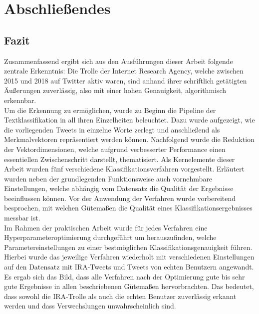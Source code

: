 \section{Abschließendes}\raggedbottom
\subsection{Fazit}
Zusammenfassend ergibt sich aus den Ausführungen dieser Arbeit folgende zentrale Erkenntnis: Die Trolle der Internet Research Agency, welche zwischen 2015 und 2018 auf Twitter aktiv waren, sind anhand ihrer schriftlich getätigten Äußerungen zuverlässig, also mit einer hohen Genauigkeit, algorithmisch erkennbar.\\
Um die Erkennung zu ermöglichen, wurde zu Beginn die Pipeline der Textklassifikation in all ihren Einzelheiten beleuchtet. Dazu wurde aufgezeigt, wie die vorliegenden Tweets in einzelne Worte zerlegt und anschließend als Merkmalvektoren repräsentiert werden können. Nachfolgend wurde die Reduktion der Vektordimensionen, welche aufgrund verbesserter Performance einen essentiellen Zwischenschritt darstellt, thematisiert. Als Kernelemente dieser Arbeit wurden fünf verschiedene Klassifikationsverfahren vorgestellt. Erläutert wurden neben der grundlegenden Funktionsweise auch vornehmbare Einstellungen, welche abhängig vom Datensatz die Qualität der Ergebnisse beeinflussen können. Vor der Anwendung der Verfahren wurde vorbereitend besprochen, mit welchen Gütemaßen die Qualität eines Klassifikationsergebnisses messbar ist.\\
Im Rahmen der praktischen Arbeit wurde für jedes Verfahren eine Hyperparameteroptimierung durchgeführt um herauszufinden, welche Parametereinstellungen zu einer bestmöglichen Klassifikationsgenauigkeit führen. Hierbei wurde das jeweilige Verfahren wiederholt mit verschiedenen Einstellungen auf den Datensatz mit IRA-Tweets und Tweets von echten Benutzern angewandt. Es ergab sich das Bild, dass alle Verfahren nach der Optimierung gute bis sehr gute Ergebnisse in allen beschriebenen Gütemaßen hervorbrachten. Das bedeutet, dass sowohl die IRA-Trolle als auch die echten Benutzer zuverlässig erkannt werden und dass Verwechslungen unwahrscheinlich sind.

